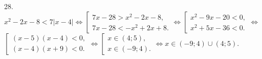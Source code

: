 28. $x^2-2x-8<7|x-4|\Leftrightarrow \left[\begin{array}{l} 7x-28>x^2-2x-8,\\ 7x-28<-x^2+2x+8.\end{array}\right.\Leftrightarrow
\left[\begin{array}{l} x^2-9x-20<0,\\ x^2+5x-36<0.\end{array}\right.\Leftrightarrow$\\$
\left[\begin{array}{l} (x-5)(x-4)<0,\\ (x-4)(x+9)<0.\end{array}\right.\Leftrightarrow
\left[\begin{array}{l} x\in(4;5),\\ x\in(-9;4).\end{array}\right.\Leftrightarrow x\in (-9;4)\cup(4;5).$\\
